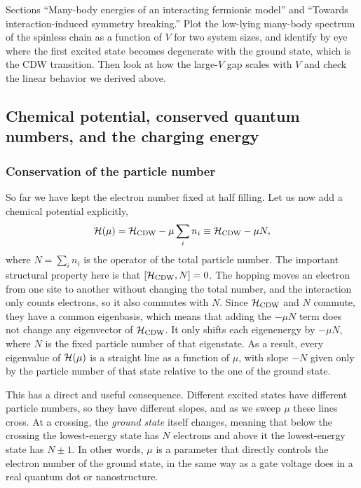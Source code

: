 \documentclass[lecture_notes.tex]{subfiles}
\begin{document}
\begin{notebook}
Sections ``Many-body energies of an interacting fermionic model'' and ``Towards
interaction-induced symmetry breaking.'' Plot the low-lying many-body spectrum of the spinless
chain as a function of $V$ for two system sizes, and identify by eye where the first excited state
becomes degenerate with the ground state, which is the CDW transition. Then look at how the
large-$V$ gap scales with $V$ and check the linear behavior we derived above.
\end{notebook}

\subsection{Chemical potential, conserved quantum numbers, and the charging energy}
\subsubsection{Conservation of the particle number}
So far we have kept the electron number fixed at half filling. Let us now add a chemical potential
explicitly,
\begin{equation}
  \mathcal{H}(\mu) = \mathcal{H}_{\mathrm{CDW}} - \mu \sum_i n_i \equiv \mathcal{H}_{\mathrm{CDW}} - \mu N,
  \label{eq:muterm}
\end{equation}
where $N = \sum_i n_i$ is the operator of the total particle number. The important structural
property here is that $[\mathcal{H}_{\mathrm{CDW}}, N] = 0$. The hopping moves an electron from one site
to another without changing the total number, and the interaction only counts electrons, so it
also commutes with $N$. Since $\mathcal{H}_{\mathrm{CDW}}$ and $N$ commute, they have a common eigenbasis,
which means that adding the $-\mu N$ term does not change any eigenvector of
$\mathcal{H}_{\mathrm{CDW}}$. It only shifts each eigenenergy by $-\mu N$, where $N$ is the fixed
particle number of that eigenstate. As a result, every eigenvalue of $\mathcal{H}(\mu)$ is a straight line
as a function of $\mu$, with slope $-N$ given only by the particle number of that state relative
to the one of the ground state.

This has a direct and useful consequence. Different excited states have different particle
numbers, so they have different slopes, and as we sweep $\mu$ these lines cross. At a crossing,
the \emph{ground state} itself changes, meaning that below the crossing the lowest-energy state has
$N$ electrons and above it the lowest-energy state has $N\pm1$. In other words, $\mu$ is a
parameter that directly controls the electron number of the ground state, in the same way as a
gate voltage does in a real quantum dot or nanostructure.
\end{document}
